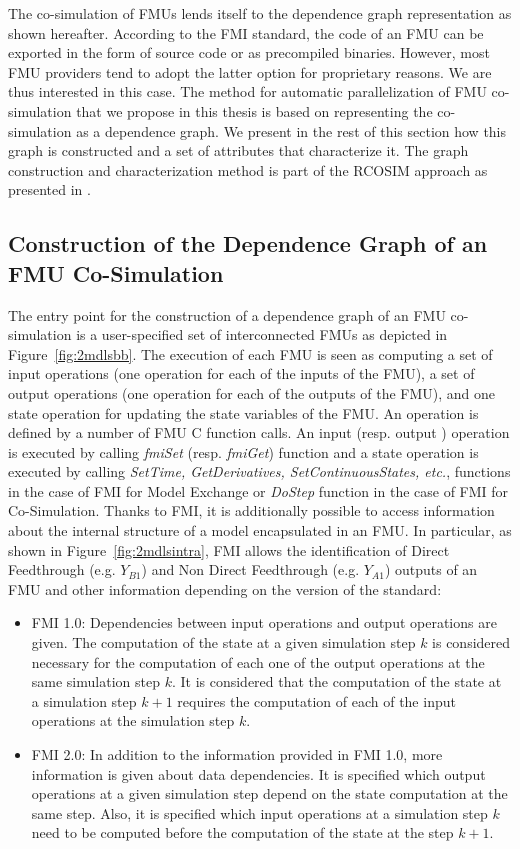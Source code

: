 The co-simulation of FMUs lends itself to the dependence graph representation as shown hereafter. According to the FMI standard, the code of an FMU can be exported in the form of source code or as precompiled binaries. However, most FMU providers tend to adopt the latter option for proprietary reasons. We are thus interested in this case. The method for automatic parallelization of FMU co-simulation that we propose in this thesis is based on representing the co-simulation as a dependence graph. We present in the rest of this section how this graph is constructed and a set of attributes that characterize it. The graph construction and characterization method is part of the RCOSIM approach as presented in \cite{benkhaled:2014}.

\subsection{Construction of the Dependence Graph of an FMU Co-Simulation}

The entry point for the construction of a dependence graph of an FMU co-simulation is a user-specified set of interconnected FMUs as depicted in Figure~\ref{fig:2mdlsbb}. The execution of each FMU is seen as computing a set of input operations (one operation for each of the inputs of the FMU), a set of output operations (one operation for each of the outputs of the FMU), and one state operation for updating the state variables of the FMU. An operation is defined by a number of FMU C function calls. An input (resp. output ) operation is executed by calling \textit{fmiSet} (resp. \textit{fmiGet}) function and a state operation is executed by calling \textit{SetTime, GetDerivatives, SetContinuousStates, etc.}, functions in the case of FMI for Model Exchange or \textit{DoStep} function in the case of FMI for Co-Simulation. Thanks to FMI, it is additionally possible to access information about the internal structure of a model encapsulated in an FMU. In particular, as shown in Figure~\ref{fig:2mdlsintra}, FMI allows the identification of Direct Feedthrough (e.g. $Y_{B1}$) and Non Direct Feedthrough (e.g. $Y_{A1}$) outputs of an FMU and other information depending on the version of the standard:

\begin{itemize}
\item FMI 1.0: Dependencies between input operations and output operations are given. The computation of the state at a given simulation step $k$ is considered necessary for the computation of each one of the output operations at the same simulation step $k$. It is considered that the computation of the state at a simulation step $k+1$ requires the computation of each of the input operations at the simulation step $k$.
\item FMI 2.0: In addition to the information provided in FMI 1.0, more information is given about data dependencies. It is specified which output operations at a given simulation step depend on the state computation at the same step. Also, it is specified which input operations at a simulation step $k$ need to be computed before the computation of the state at the step $k+1$.  
\end{itemize}

